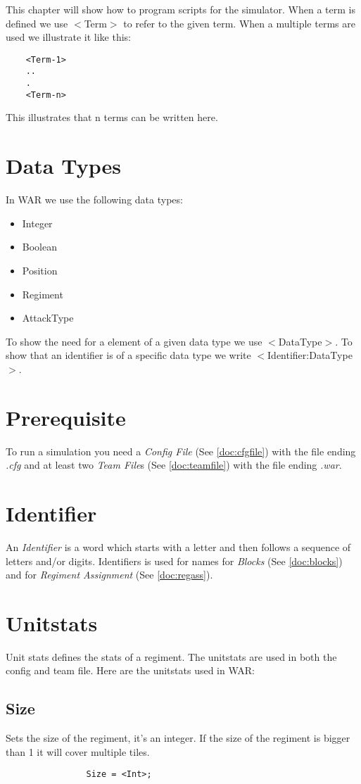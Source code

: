 This chapter will show how to program scripts for the simulator. When a term is defined we use $<$Term$>$ to refer to the given term. 
When a multiple terms are used we illustrate it like this: \\
\begin{verbatim}
	<Term-1>
	..
	.
	<Term-n>
\end{verbatim}
This illustrates that n terms can be written here.
\section{Data Types}
	In WAR we use the following data types: \\
	\begin{itemize}
		\item Integer
		\item Boolean
		\item Position
		\item Regiment
		\item AttackType
	\end{itemize}
	To show the need for a element of a given data type we use $<$DataType$>$.
	To show that an identifier is of a specific data type we write $<$Identifier:DataType$>$.

\section{Prerequisite}
	To run a simulation you need a {\it Config File} (See \ref{doc:cfgfile}) with the file ending {\it .cfg} and at least two {\it Team File}s 
	(See \ref{doc:teamfile}) with the file ending {\it .war}.
\section{Identifier}
	An {\it Identifier} is a word which starts with a letter and then follows a sequence of letters and/or digits.
	Identifiers is used for names for {\it Blocks} (See \ref{doc:blocks}) and for {\it Regiment Assignment} (See \ref{doc:regass}).
\section{Unitstats}
	Unit stats defines the stats of a regiment. The unitstats are used in both the config and team file. Here are the unitstats used in WAR: \\
		\subsection{Size}
			Sets the size of the regiment, it's an integer.
			If the size of the regiment is bigger than 1 it will cover multiple tiles.
			\begin{verbatim}
				Size = <Int>;
			\end{verbatim}
